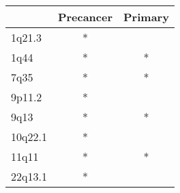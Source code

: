 \begin{tabular}{lcc}
\toprule
{} & Precancer & Primary \\
\midrule
1q21.3  &         * &         \\
1q44    &         * &       * \\
7q35    &         * &       * \\
9p11.2  &         * &         \\
9q13    &         * &       * \\
10q22.1 &         * &         \\
11q11   &         * &       * \\
22q13.1 &         * &         \\
\bottomrule
\end{tabular}
